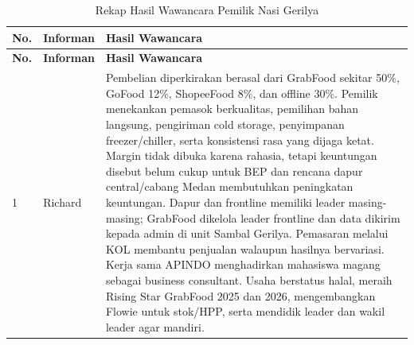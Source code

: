 \begingroup
\scriptsize
\begin{xltabular}{\textwidth}{|C{0.7cm}|L{3.1cm}|Y|}
\caption{Rekap Hasil Wawancara Pemilik Nasi Gerilya}
\label{tab:rekap-wawancara-pemilik-nasi-gerilya} \\
\toprule
\textbf{No.} & \textbf{Informan} & \textbf{Hasil Wawancara} \\ \hline
\midrule
\endfirsthead

\toprule
\textbf{No.} & \textbf{Informan} & \textbf{Hasil Wawancara} \\ \hline
\midrule
\endhead

\endfoot

\bottomrule
\endlastfoot

1 & Richard & Pembelian diperkirakan berasal dari GrabFood sekitar 50\%, GoFood 12\%, ShopeeFood 8\%, dan offline 30\%. Pemilik menekankan pemasok berkualitas, pemilihan bahan langsung, pengiriman cold storage, penyimpanan freezer/chiller, serta konsistensi rasa yang dijaga ketat. Margin tidak dibuka karena rahasia, tetapi keuntungan disebut belum cukup untuk BEP dan rencana dapur central/cabang Medan membutuhkan peningkatan keuntungan. Dapur dan frontline memiliki leader masing-masing; GrabFood dikelola leader frontline dan data dikirim kepada admin di unit Sambal Gerilya. Pemasaran melalui KOL membantu penjualan walaupun hasilnya bervariasi. Kerja sama APINDO menghadirkan mahasiswa magang sebagai business consultant. Usaha berstatus halal, meraih Rising Star GrabFood 2025 dan 2026, mengembangkan Flowie untuk stok/HPP, serta mendidik leader dan wakil leader agar mandiri. \\ \hline
\end{xltabular}
\endgroup

